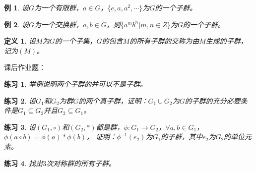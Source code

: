 \documentclass{article}
\newtheorem{Def}{定义}
\newtheorem{Exercise}{练习}
\newtheorem*{Example}{例}
\begin{document}
\begin{CJK*}{UTF8}{gbsn}
\begin{Example}
  设$G$为一个有限群，$a\in G$，$\{e,a,a^2,\cdots\}$为$G$的一个子群。
\end{Example}

\begin{Example}
  设$G$为一个交换群，$a,b\in G$，则$\{a^mb^n|m,n\in Z\}$为$G$的一个子群。
\end{Example}

\begin{Def}
  设$M$为$G$的一个子集，$G$的包含$M$的所有子群的交称为由$M$生成的子群，记为$(M)$。
\end{Def}
课后作业题：
\begin{Exercise}
举例说明两个子群的并可以不是子群。
\end{Exercise}
\begin{Exercise}
  设$G_1$和$G_2$为群$G$的两个真子群，证明：$G_1\cup G_2$为$G$的子群的充分必要条件是$G_1\subseteq G_2$并且$G_2\subseteq G_1$。
\end{Exercise}

\begin{Exercise}
  设$(G_1,\circ)$和$(G_2,*)$都是群，$\phi:G_1\to G_2$，$\forall a,b\in G_1$，$\phi(a\circ b)=\phi(a)*\phi(b)$，
  证明：$\phi^{-1}(e_2)$为$G_1$的子群，其中$e_2$为$G_2$的单位元素。
\end{Exercise}

\begin{Exercise}
  找出$3$次对称群的所有子群。
\end{Exercise}
\end{CJK*}
\end{document}

